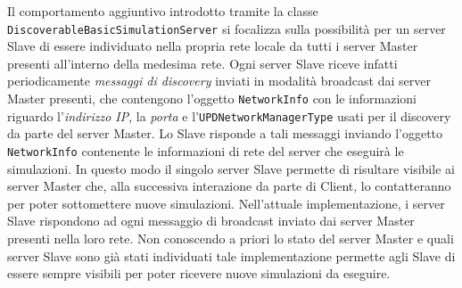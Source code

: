 Il comportamento aggiuntivo introdotto tramite la classe \texttt{DiscoverableBasicSimulationServer} si focalizza sulla possibilità per un server Slave di essere individuato nella propria rete locale da tutti i server Master
presenti all'interno della medesima rete. Ogni server Slave riceve infatti periodicamente \emph{messaggi di discovery} inviati in modalità broadcast dai server Master presenti, che contengono l'oggetto \texttt{NetworkInfo} con le informazioni riguardo l'\emph{indirizzo IP}, la \emph{porta} e l'\texttt{UPDNetworkManagerType} usati per il discovery da parte del server Master. Lo Slave risponde a tali messaggi inviando l'oggetto \texttt{NetworkInfo} contenente le informazioni di rete del server che eseguirà le simulazioni. In questo modo il singolo server Slave
permette di risultare visibile ai server Master che, alla successiva interazione da parte di Client, lo contatteranno per poter sottomettere nuove simulazioni.
Nell'attuale implementazione, i server Slave rispondono ad ogni messaggio di broadcast inviato dai server Master presenti nella loro rete. Non conoscendo a priori lo stato del server Master e quali server Slave sono già stati individuati
tale implementazione permette agli Slave di essere sempre visibili per poter ricevere nuove simulazioni da eseguire.